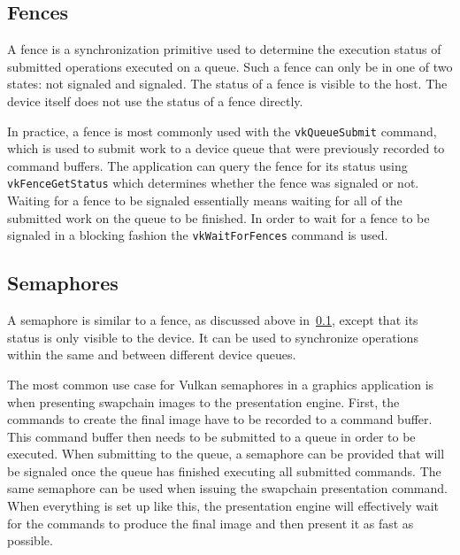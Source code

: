 
    \subsection{Fences}
    \label{sub:Fences}
      A fence is a synchronization primitive used to determine the execution status of submitted operations executed on a queue. Such a fence can only be in one of two states: not signaled and signaled. The status of a fence is visible to the \gls{host}. The device itself does not use the status of a fence directly.

      In practice, a fence is most commonly used with the \lstinline{vkQueueSubmit} command, which is used to submit work to a device queue that were previously recorded to command buffers. The \gls{application} can query the fence for its status using \lstinline{vkFenceGetStatus} which determines whether the fence was signaled or not. Waiting for a fence to be signaled essentially means waiting for all of the submitted work on the queue to be finished. In order to wait for a fence to be signaled in a blocking fashion the \lstinline{vkWaitForFences} command is used.

    \subsection{Semaphores}
    \label{sub:Semaphores}
      A semaphore is similar to a fence, as discussed above in~\ref{sub:Fences}, except that its status is only visible to the device. It can be used to synchronize operations within the same and between different device queues.

      The most common use case for Vulkan semaphores in a graphics \gls{application} is when presenting swapchain images to the presentation engine. First, the commands to create the final image have to be recorded to a command buffer. This command buffer then needs to be submitted to a queue in order to be executed. When submitting to the queue, a semaphore can be provided that will be signaled once the queue has finished executing all submitted commands. The same semaphore can be used when issuing the swapchain presentation command. When everything is set up like this, the presentation engine will effectively wait for the commands to produce the final image and then present it as fast as possible.

